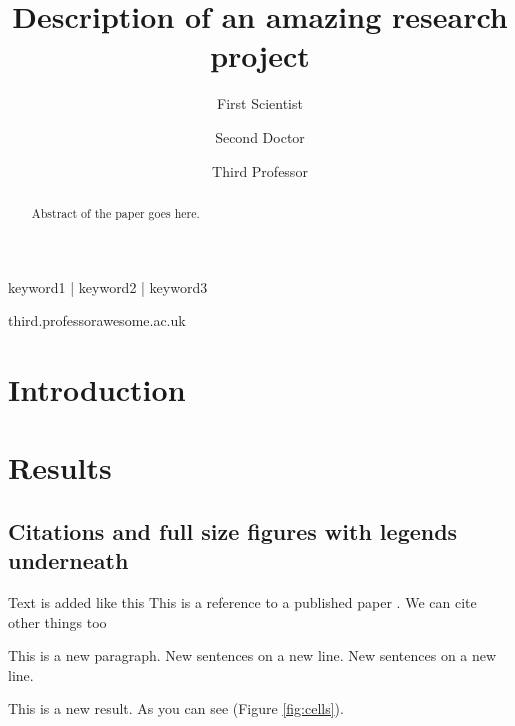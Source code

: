 
\title{Description of an amazing research project}

\author[1]{First Scientist }
\author[2]{Second Doctor }
\author[1,\Letter]{Third Professor }
\date{}

\maketitle

\begin{abstract}
Abstract of the paper goes here.
\lipsum[1]
\end{abstract}

\begin{keywords}
keyword1 | keyword2 | keyword3
\end{keywords}

\begin{corrauthor}
third.professor\at awesome.ac.uk
\end{corrauthor}

\section*{Introduction}\label{s:introduction}


\section*{Results}\label{s:results}

\subsection*{Citations and full size figures with legends underneath}

Text is added like this
This is a reference to a published paper \citep{watson_molecular_1953}.
We can cite other things too \citep{tipton_complexities_2019,zheng_genome_2011,alberts_molecular_2002}

This is a new paragraph.
New sentences on a new line.
New sentences on a new line.

This is a new result.
As you can see (Figure \ref{fig:cells}).

